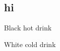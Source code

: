 \documentclass{article}
\begin{document}
\begin{comment}
 little comment: <p>&#x03C0; &#960;</p> 
\end{comment}
\begin{description}[style=unboxed, labelwidth=\linewidth, font =\sffamily\itshape\bfseries, listparindent =0pt, before =\sffamily]
\section{hi}
\item[\href{https://google.com/home}{Coffee}]

Black hot drink
\item[Milk]

White cold drink
\end{description}
\end{document}
